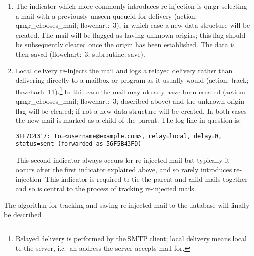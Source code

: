 \documentclass[a4paper,12pt,draft]{article}
\begin{document}
\begin{enumerate}

    \item The indicator which more commonly introduces re-injection is qmgr
        selecting a mail with a previously unseen queueid for delivery
        (action: qmgr\_chooses\_mail; flowchart:~3), in which case a new
        data structure will be created.  The mail will be flagged as having
        unknown origins; this flag should be subsequently cleared once the
        origin has been established.  The data is then saved (flowchart:~3;
        subroutine: save).  

    \item Local delivery re-injects the mail and logs a relayed delivery
        rather than delivering directly to a mailbox or program as it
        usually would (action: track; flowchart:~11).\footnote{Relayed
        delivery is performed by the SMTP client; local delivery means
        local to the server, i.e.\ an address the server accepts mail for.}
        In this case the mail may already have been created (action:
        qmgr\_chooses\_mail; flowchart:~3; described above) and the unknown
        origin flag will be cleared; if not a new data structure will be
        created.  In both cases the new mail is marked as a child of the
        parent.  The log line in question is:

        \texttt{3FF7C4317: to=<username@example.com>, relay=local, \newline 
        delay=0, status=sent (forwarded as 56F5B43FD)}

        This second indicator always occurs for re-injected mail but
        typically it occurs after the first indicator explained above, and
        so rarely introduces re-injection.  This indicator is required to
        tie the parent and child mails together and so is central to the
        process of tracking re-injected mails.

\end{enumerate}

The algorithm for tracking and saving re-injected mail to the database will
finally be described:
\end{document}
